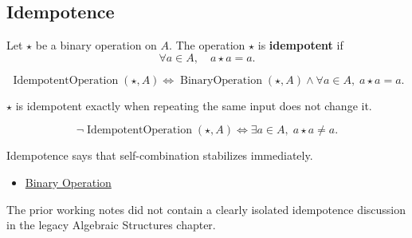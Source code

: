 \subsection*{Idempotence}
\label{subsec:idempotence}

\begin{definition}
\label{def:idempotent-operation}
Let $\star$ be a binary operation on $A$.
The operation $\star$ is \textbf{idempotent} if
\[
\forall a \in A,\quad a \star a = a.
\]
\end{definition}

\begin{remark*}
\[
\operatorname{IdempotentOperation}(\star,A)
\Longleftrightarrow
\operatorname{BinaryOperation}(\star,A)
\land
\forall a\in A,\; a\star a=a.
\]
\end{remark*}

\begin{remark*}
$\star$ is idempotent exactly when repeating the same input does not change it.
\end{remark*}

\begin{remark*}
\[
\neg\operatorname{IdempotentOperation}(\star,A)
\Longleftrightarrow
\exists a\in A,\; a\star a\neq a.
\]
\end{remark*}

\begin{remark*}[Interpretation]
Idempotence says that self-combination stabilizes immediately.
\end{remark*}

\begin{dependencies}
\begin{itemize}
  \item \hyperref[def:binary-operation]{Binary Operation}
\end{itemize}
\end{dependencies}

\begin{remark*}
The prior working notes did not contain a clearly isolated idempotence
discussion in the legacy Algebraic Structures chapter.
\end{remark*}
